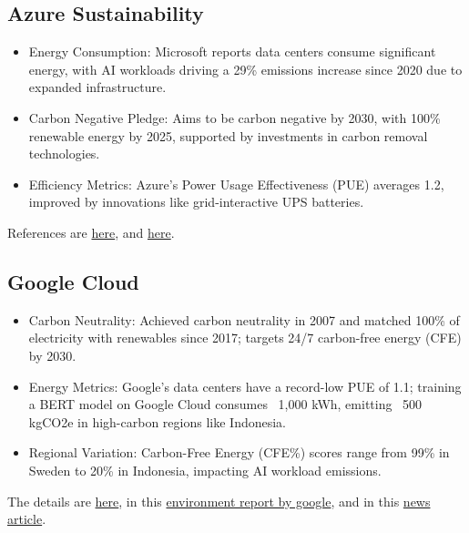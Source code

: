 \documentclass{article}
\theoremstyle{mytheoremstyle}
\theoremstyle{mytheoremstyle}
\theoremstyle{myproblemstyle}
\begin{document}
\subsection{Azure Sustainability}
\begin{itemize}
    \item Energy Consumption: Microsoft reports data centers consume significant energy, with AI workloads driving a 29\% emissions increase since 2020 due to expanded infrastructure.
    \item Carbon Negative Pledge: Aims to be carbon negative by 2030, with 100\% renewable energy by 2025, supported by investments in carbon removal technologies.
    \item Efficiency Metrics: Azure’s Power Usage Effectiveness (PUE) averages 1.2, improved by innovations like grid-interactive UPS batteries.
\end{itemize}
References are \href{https://blogs.microsoft.com/on-the-issues/2024/05/15/microsoft-environmental-sustainability-report-2024/}{here}, and \href{https://datacenters.microsoft.com/sustainability/efficiency/}{here}.

\subsection{Google Cloud}
\begin{itemize}
    \item Carbon Neutrality: Achieved carbon neutrality in 2007 and matched 100\% of electricity with renewables since 2017; targets 24/7 carbon-free energy (CFE) by 2030.
    \item Energy Metrics: Google’s data centers have a record-low PUE of 1.1; training a BERT model on Google Cloud consumes ~1,000 kWh, emitting ~500 kgCO2e in high-carbon regions like Indonesia.
    \item Regional Variation: Carbon-Free Energy (CFE\%) scores range from 99\% in Sweden to 20\% in Indonesia, impacting AI workload emissions.
\end{itemize}
The details are \href{https://cloud.google.com/blog/topics/sustainability/sharing-carbon-free-energy-percentage-for-google-cloud-regions}{here}, in this \href{https://sustainability.google/reports/environmental-report-2019/}{environment report by google}, and in this \href{https://blog.google/outreach-initiatives/sustainability/data-centers-energy-efficient/}{news article}.
\end{document}
